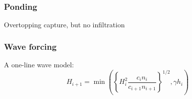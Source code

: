 \documentclass[aspectratio=169]{beamer}
\begin{document}
\begin{frame}
  \frametitle{Ponding}
  Overtopping capture, but no infiltration
    \centering
\end{frame}
\begin{frame}
  \frametitle{Wave forcing}
  A one-line wave model:
  \begin{equation*}
    H_{i+1}=\min{\left(\left\{ H_i^2 \frac{c_i n_i}{c_{i+1} n_{i+1}}\right\}^{1/2},\gamma h_i\right)}
  \end{equation*}
  
    \centering
\end{frame}
\end{document}
